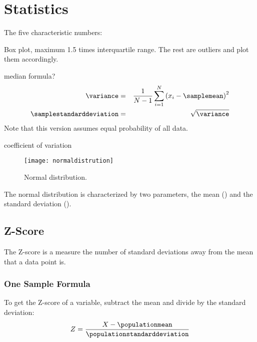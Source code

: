 \documentclass{article}
\begin{document}
	\chapter{Statistics}

The five characteristic numbers:
	\begin{plainlist}
		\item \xsmallest{}
		\item \quartileone{}
		\item \quartiletwo{}
		\item \quartilethree{}
		\item \xlargest{}
	\end{plainlist}

Box plot, maximum 1.5 times interquartile range.  The rest are outliers and plot them accordingly.



median formula?
	\begin{eqnarray}
		\variance 					& = & \frac{1}{N-1}\sum^N_{i=1}\left(x_i - \samplemean\right)^2 \\
		\samplestandarddeviation	& = & \sqrt{\variance}
	\end{eqnarray}
Note that this version assumes equal probability of all data.



coefficient of variation

	\begin{figure}[tbp]
		\centering
		\texttt{[image: normaldistrution]}
		\caption{Normal distribution.}
		\label{fig:normaldistrution}
	\end{figure}

The normal distribution is characterized by two parameters, the mean (\populationmean) and the standard deviation (\populationstandarddeviation).

	\section{Z-Score}
The Z-score is a measure the number of standard deviations away from the mean that a data point is.

	\subsection{One Sample Formula}
To get the Z-score of a variable, subtract the mean and divide by the standard deviation:
	\begin{equation}
		Z = \frac{X-\populationmean}{\populationstandarddeviation}
	\end{equation}
	\begin{mathwhere}
	\end{mathwhere}
\end{document}

